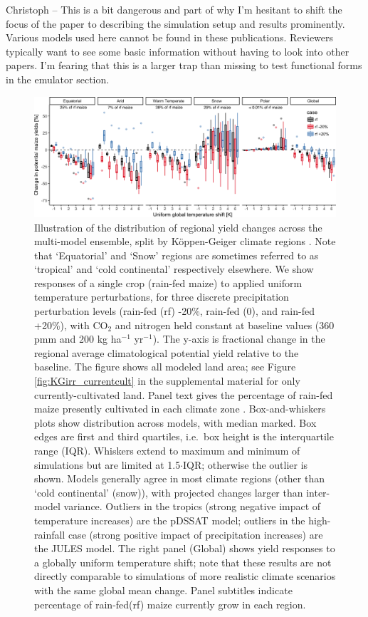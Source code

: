 \documentclass[esd, final]{copernicus} %
\begin{document}
{\color{red} Christoph -- This is a bit dangerous and part of why I'm hesitant to shift the focus of the paper to describing the simulation setup and results prominently. Various models used here cannot be found in these publications. Reviewers typically want to see some basic information without having to look into other papers. 
I'm fearing that this is a larger trap than missing to test functional forms in the emulator section.}

\begin{figure}[h]
\centering
   \includegraphics[width=14cm]{figures/global_sim_CG.png}
   \caption{Illustration of the distribution of regional yield changes across the multi-model ensemble, split by K\"{o}ppen-Geiger climate regions \citep{rubel2010}. Note that `Equatorial' and `Snow' regions are sometimes referred to as `tropical' and `cold continental' respectively elsewhere. We show responses of a single crop (rain-fed maize) to applied uniform temperature perturbations, for three discrete precipitation perturbation levels (rain-fed (rf) -20\%, rain-fed (0), and rain-fed +20\%), with CO$_2$ and nitrogen held constant at baseline values (360 pmm and 200 kg ha$^{-1}$ yr$^{-1}$). The y-axis is fractional change in the regional average climatological potential yield relative to the baseline. The figure shows all modeled land area; see Figure \ref{fig:KGirr_currentcult} in the supplemental material for only currently-cultivated land. Panel text gives the percentage of rain-fed maize presently cultivated in each climate zone \citep[data from][]{Portmann2010}. Box-and-whiskers plots show distribution across models, with median marked. Box edges are first and third quartiles, i.e.\ box height is the interquartile range (IQR). Whiskers extend to maximum and minimum of simulations but are limited at 1.5$\cdot$IQR; otherwise the outlier is shown. Models generally agree in most climate regions (other than `cold continental' (snow)), with projected changes larger than inter-model variance. Outliers in the tropics (strong negative impact of temperature increases) are the pDSSAT model; outliers in the high-rainfall case (strong positive impact of precipitation increases) are the JULES model. The right panel (Global) shows yield responses to a globally uniform temperature shift; note that these results are not directly comparable to simulations of more realistic climate scenarios with the same global mean change. Panel subtitles indicate percentage of rain-fed(rf) maize currently grow in each region.}
   \label{fig:globesim}
\end{figure}
\end{document}
